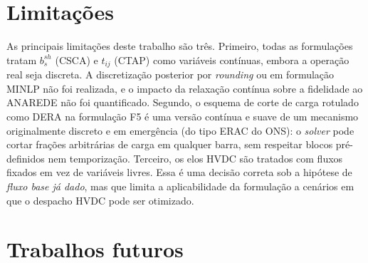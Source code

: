 \section{Limitações}
\label{sec:limitacoes}

As principais limitações deste trabalho são três. Primeiro, todas as formulações tratam $b^{sh}_s$ (CSCA) e $t_{ij}$ (CTAP) como variáveis contínuas, embora a operação real seja discreta. A discretização posterior por \textit{rounding} ou em formulação MINLP não foi realizada, e o impacto da relaxação contínua sobre a fidelidade ao ANAREDE não foi quantificado. Segundo, o esquema de corte de carga rotulado como DERA na formulação F5 é uma versão contínua e suave de um mecanismo originalmente discreto e em emergência (do tipo ERAC do ONS): o \textit{solver} pode cortar frações arbitrárias de carga em qualquer barra, sem respeitar blocos pré-definidos nem temporização. Terceiro, os elos HVDC são tratados com fluxos fixados em vez de variáveis livres. Essa é uma decisão correta sob a hipótese de \textit{fluxo base já dado}, mas que limita a aplicabilidade da formulação a cenários em que o despacho HVDC pode ser otimizado.

\section{Trabalhos futuros}
\label{sec:trabalhos-futuros}


